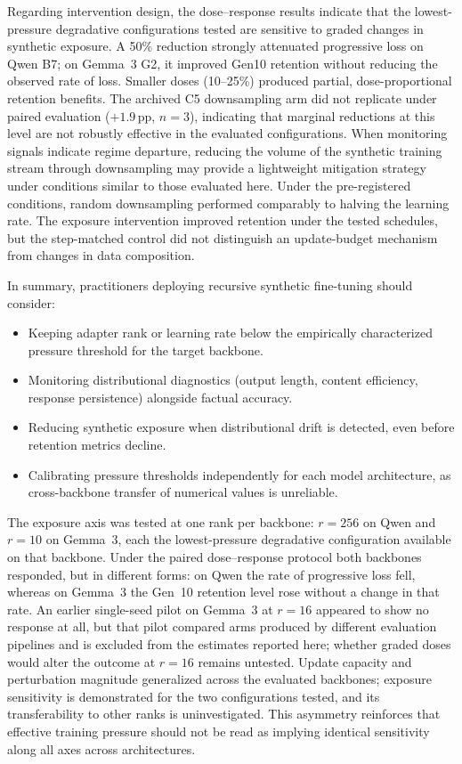 \documentclass[a4paper,fleqn]{cas-dc}
\newif\ifshowchanges
\newcommand{\rev}[1]{\ifshowchanges{\color{blue}#1}\else{#1}\fi}
\begin{document}
Regarding intervention design, the \rev{dose--response results indicate that the lowest-pressure degradative configurations tested} are sensitive to graded changes in synthetic exposure. \rev{A 50\%
reduction strongly attenuated progressive loss on Qwen B7; on Gemma~3 G2,
it improved Gen10 retention without reducing the observed rate of loss.
Smaller doses (10--25\%) produced partial, dose-proportional retention benefits. The archived C5 downsampling arm did not replicate under paired evaluation ($+1.9$\,pp,
$n=3$), indicating that marginal reductions at this level are not robustly
effective in the evaluated configurations.} When
monitoring signals indicate regime departure, reducing the volume of the
synthetic training stream through downsampling
may provide a lightweight mitigation strategy under conditions
similar to those evaluated here. \rev{Under the pre-registered conditions, random downsampling performed
comparably to halving the learning rate. The exposure intervention improved
retention under the tested schedules, but the step-matched control did not
distinguish an update-budget mechanism from changes in data composition.}

In summary, practitioners deploying recursive synthetic fine-tuning should
consider:
\begin{itemize}
    \item Keeping adapter rank or learning rate below the empirically
    characterized pressure threshold for the target backbone.
    \item Monitoring distributional diagnostics (output length, content
    efficiency, response persistence) alongside factual accuracy.
    \item Reducing synthetic exposure when distributional drift is detected,
    even before retention metrics decline.
    \item Calibrating pressure thresholds independently for each model
    architecture, as cross-backbone transfer of numerical values is unreliable.
\end{itemize}

The exposure axis was tested at one rank per backbone: $r=256$ on Qwen and $r=10$ on Gemma~3, each the lowest-pressure degradative configuration available on that backbone. Under the paired dose--response protocol both backbones responded, but in different forms: on Qwen the rate of progressive loss fell, whereas on Gemma~3 the Gen~10 retention level rose without a change in that rate. An earlier single-seed pilot on Gemma~3 at $r=16$ appeared to show no response at all, but that pilot compared arms produced by different evaluation pipelines and is excluded from the estimates reported here; whether graded doses would alter the outcome at $r=16$ remains untested. Update capacity and perturbation magnitude \rev{generalized across the evaluated backbones}; exposure sensitivity is demonstrated for the two configurations tested, and its transferability to other ranks is uninvestigated. \rev{This asymmetry reinforces that effective training pressure should not be read as implying identical sensitivity along all axes across architectures.}
\end{document}
